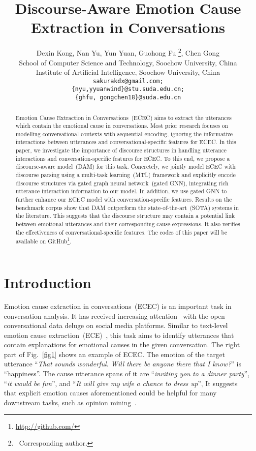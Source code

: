 \documentclass[11pt]{article}
\title{Discourse-Aware Emotion Cause Extraction in Conversations}
\author{Dexin Kong\Mark{1}, Nan Yu\Mark{1}, Yun Yuan\Mark{1}, Guohong Fu\Mark{1}\Mark{,}\Mark{2} \thanks{~Corresponding author.}, Chen Gong\Mark{1}\Mark{,}\Mark{2}\\
\Mark{1}School of Computer Science and Technology, Soochow University, China \\
\Mark{2}Institute of Artificial Intelligence, Soochow University, China \\
  \texttt{sakurakdx@gmail.com;}\\
  \texttt{\{nyu,yyuanwind\}@stu.suda.edu.cn;}\\
  \texttt{\{ghfu, gongchen18\}@suda.edu.cn}
}
\begin{document}
\maketitle


\begin{abstract}
Emotion Cause Extraction in Conversations~(ECEC) aims to extract the utterances which contain the emotional cause in conversations.
Most prior research focuses on modelling conversational contexts with sequential encoding, ignoring the informative interactions between utterances and conversational-specific features for ECEC.
In this paper, we investigate the importance of discourse structures in handling utterance interactions and conversation-specific features for ECEC.
To this end, we propose a discourse-aware model~(DAM) for this task.
Concretely, we jointly model ECEC with discourse parsing using a multi-task learning~(MTL) framework and explicitly encode discourse structures via gated graph neural network~(gated GNN),
integrating rich utterance interaction information to our model.
In addition, we use gated GNN to further enhance our ECEC model with conversation-specific features.
Results on the benchmark corpus show that DAM
outperform the state-of-the-art~(SOTA) systems in the literature. 
This suggests that the discourse structure may contain a potential link between emotional utterances and their
corresponding cause expressions.
It also verifies the effectiveness of conversational-specific features.
The codes of this paper will be available on GitHub\footnote{\url{http://github.com/}}. 
\end{abstract}
    

\section{Introduction}
Emotion cause extraction in conversations~(ECEC) is an important task in conversation analysis.
It has received increasing attention~\cite{poria2021recognizing,multimodal_2021_wang} with the open conversational data deluge on social media platforms.
Similar to text-level emotion cause extraction~(ECE)~\cite{lee2010text}, this task aims to identify utterances that contain explanations for emotional causes in the given conversation.
The right part of Fig.~\ref{fig1} shows an example of ECEC.
The emotion of the target utterance ``\textit{That sounds wonderful. Will there be anyone there that I know?}'' is ``happiness''.
The cause utterance spans of it are ``\textit{inviting you to a dinner party}'', ``\textit{it would be fun}'', and ``\textit{It will give my wife a chance to dress up}'', 
It suggests that explicit emotion causes aforementioned could be helpful for many downstream tasks, such as opinion mining~\cite{choiIdentifyingSourcesOpinions2005, dasFindingEmotionHolder2010}.
\end{document}
